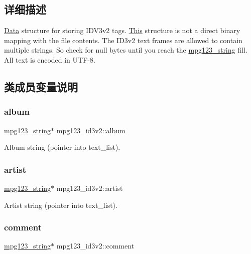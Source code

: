 \subsection{详细描述}
\hyperlink{struct_data}{Data} structure for storing I\+D\+V3v2 tags. \hyperlink{namespace_this}{This} structure is not a direct binary mapping with the file contents. The I\+D3v2 text frames are allowed to contain multiple strings. So check for null bytes until you reach the \hyperlink{structmpg123__string}{mpg123\+\_\+string} fill. All text is encoded in U\+T\+F-\/8. 

\subsection{类成员变量说明}
\mbox{\label{structmpg123__id3v2_adb45f4408f3e650dc70282060d631336}} 
\subsubsection{\texorpdfstring{album}{album}}
{\footnotesize\ttfamily \hyperlink{structmpg123__string}{mpg123\+\_\+string}$\ast$ mpg123\+\_\+id3v2\+::album}

Album string (pointer into text\+\_\+list). \mbox{\label{structmpg123__id3v2_a5d269222d5c917356f337e999a38c1f3}} 
\subsubsection{\texorpdfstring{artist}{artist}}
{\footnotesize\ttfamily \hyperlink{structmpg123__string}{mpg123\+\_\+string}$\ast$ mpg123\+\_\+id3v2\+::artist}

Artist string (pointer into text\+\_\+list). \mbox{\label{structmpg123__id3v2_a33f276ee0202d9bb8609b90a2dc84e41}} 
\subsubsection{\texorpdfstring{comment}{comment}}
{\footnotesize\ttfamily \hyperlink{structmpg123__string}{mpg123\+\_\+string}$\ast$ mpg123\+\_\+id3v2\+::comment}

